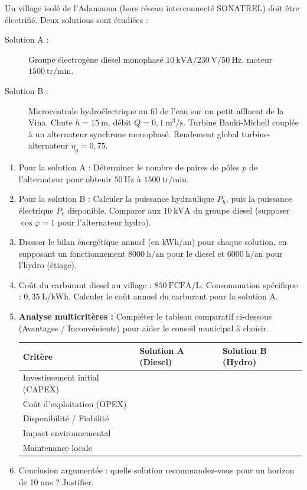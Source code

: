 \documentclass[11pt]{article}
\begin{document}
\begin{exercice}
\label{exo:probatoire_zone_rurale}
Un village isolé de l'Adamaoua (hors réseau interconnecté SONATREL) doit être électrifié. Deux solutions sont étudiées :
\begin{description}
    \item[Solution A :] Groupe électrogène diesel monophasé $10~\text{kVA} / 230~\text{V} / 50~\text{Hz}$, moteur $1500~\text{tr/min}$.
    \item[Solution B :] Microcentrale hydroélectrique au fil de l'eau sur un petit affluent de la Vina. Chute $h = 15~\text{m}$, débit $Q = 0,1~\text{m}^3/\text{s}$. Turbine Banki-Michell couplée à un alternateur synchrone monophasé. Rendement global turbine-alternateur $\eta_g = 0,75$.
\end{description}
\begin{enumerate}
    \item Pour la solution A : Déterminer le nombre de paires de pôles $p$ de l'alternateur pour obtenir $50~\text{Hz}$ à $1500~\text{tr/min}$.
    \item Pour la solution B : Calculer la puissance hydraulique $P_h$, puis la puissance électrique $P_e$ disponible. Comparer aux $10~\text{kVA}$ du groupe diesel (supposer $\cos\varphi = 1$ pour l'alternateur hydro).
    \item Dresser le bilan énergétique annuel (en kWh/an) pour chaque solution, en supposant un fonctionnement $8000~\text{h/an}$ pour le diesel et $6000~\text{h/an}$ pour l'hydro (étiage).
    \item Coût du carburant diesel au village : $850~\text{FCFA/L}$. Consommation spécifique : $0,35~\text{L/kWh}$. Calculer le coût annuel du carburant pour la solution A.
    \item \textbf{Analyse multicritères :} Compléter le tableau comparatif ci-dessous (Avantages / Inconvénients) pour aider le conseil municipal à choisir.
    \begin{center}
    \begin{tabularx}{\linewidth}{|l|X|X|}\hline
    Critère & Solution A (Diesel) & Solution B (Hydro) \\ \hline
    Investissement initial (CAPEX) & & \\ \hline
    Coût d'exploitation (OPEX) & & \\ \hline
    Disponibilité / Fiabilité & & \\ \hline
    Impact environnemental & & \\ \hline
    Maintenance locale & & \\ \hline
    \end{tabularx}
    \end{center}
    \item Conclusion argumentée : quelle solution recommandez-vous pour un horizon de 10 ans ? Justifier.
\end{enumerate}
\end{exercice}
\end{document}

